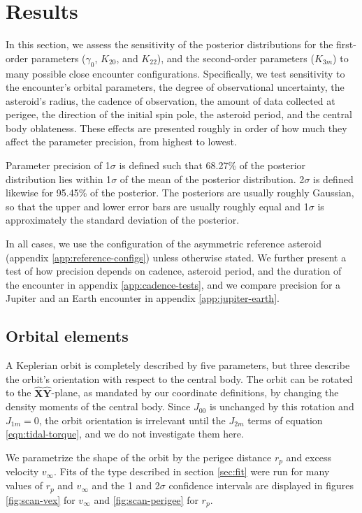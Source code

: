 \documentclass[fleqn,usenatbib]{mnras}
\newcommand{\unit}[1]{\bm{\hat{#1}}}
\begin{document}
\section{Results}
\label{sec:results}

In this section, we assess the sensitivity of the posterior distributions for the first-order parameters ($\gamma_0$, $K_{20}$, and $K_{22}$), and the second-order parameters ($K_{3m}$) to many possible close encounter configurations. Specifically, we test sensitivity to the encounter's orbital parameters, the degree of observational uncertainty, the asteroid's radius, the cadence of observation, the amount of data collected at perigee, the direction of the initial spin pole, the asteroid period, and the central body oblateness. These effects are presented roughly in order of how much they affect the parameter precision, from highest to lowest.

Parameter precision of 1$\sigma$ is defined such that 68.27\% of the posterior distribution lies within 1$\sigma$ of the mean of the posterior distribution. 2$\sigma$ is defined likewise for 95.45\% of the posterior. The posteriors are usually roughly Gaussian, so that the upper and lower error bars are usually roughly equal and 1$\sigma$ is approximately the standard deviation of the posterior.

In all cases, we use the configuration of the asymmetric reference asteroid (appendix \ref{app:reference-configs}) unless otherwise stated. We further present a test of how precision depends on cadence, asteroid period, and the duration of the encounter in appendix \ref{app:cadence-tests}, and we compare precision for a Jupiter and an Earth encounter in appendix \ref{app:jupiter-earth}.


\subsection{Orbital elements}
\label{sec:scan-orbit}
A Keplerian orbit is completely described by five parameters, but three describe the orbit's orientation with respect to the central body. The orbit can be rotated to the $\unit X \unit Y$-plane, as mandated by our coordinate definitions, by changing the density moments of the central body. Since $J_{00}$ is unchanged by this rotation and $J_{1m}=0$, the orbit orientation is irrelevant until the $J_{2m}$ terms of equation \ref{eqn:tidal-torque}, and we do not investigate them here.

We parametrize the shape of the orbit by the perigee distance $r_p$ and excess velocity $v_\infty$. Fits of the type described in section \ref{sec:fit} were run for many values of $r_p$ and $v_\infty$ and the 1 and 2$\sigma$ confidence intervals are displayed in figures \ref{fig:scan-vex} for $v_\infty$ and \ref{fig:scan-perigee} for $r_p$.
\end{document}
